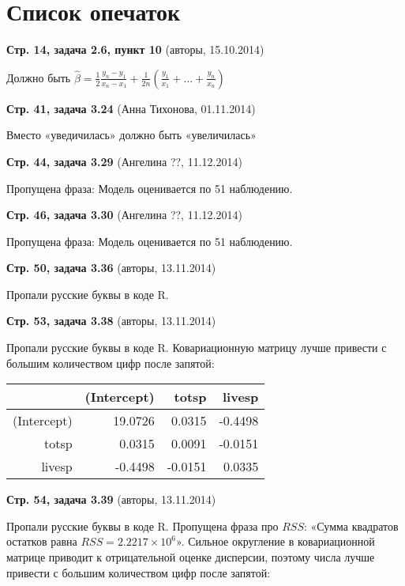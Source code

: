 \documentclass[12pt]{article} %
\newcommand{\erroronpage}[4]{\textbf{Стр. #1, #2} (#3, #4)}
\begin{document}

\section*{Список опечаток}


\erroronpage{14}{задача 2.6, пункт 10}{авторы}{15.10.2014}

Должно быть $\hat{\beta} = \frac{1}{2} \frac{y_n - y_1}{x_n - x_1} + \frac{1}{2n}  \left( \frac{y_1}{x_1} + \ldots + \frac{y_n}{x_n} \right) $

\erroronpage{41}{задача 3.24}{Анна Тихонова}{01.11.2014}

Вместо «уведичилась» должно быть «увеличилась»

\erroronpage{44}{задача 3.29}{Ангелина ??}{11.12.2014}

Пропущена фраза: Модель оценивается по 51 наблюдению.

\erroronpage{46}{задача 3.30}{Ангелина ??}{11.12.2014}

Пропущена фраза: Модель оценивается по 51 наблюдению.

\erroronpage{50}{задача 3.36}{авторы}{13.11.2014}

Пропали русские буквы в коде R.

\erroronpage{53}{задача 3.38}{авторы}{13.11.2014}

Пропали русские буквы в коде R. Ковариационную матрицу лучше привести с большим количеством цифр после запятой:

\begin{table}[ht]
\centering
\begin{tabular}{rrrr}
  \hline
 & (Intercept) & totsp & livesp \\
  \hline
(Intercept) & 19.0726 & 0.0315 & -0.4498 \\
  totsp & 0.0315 & 0.0091 & -0.0151 \\
  livesp & -0.4498 & -0.0151 & 0.0335 \\
   \hline
\end{tabular}
\end{table}


\erroronpage{54}{задача 3.39}{авторы}{13.11.2014}

Пропали русские буквы в коде R. Пропущена фраза про $RSS$:
«Сумма квадратов остатков равна $RSS=\ensuremath{2.2217\times 10^{6}}$».
Сильное округление в ковариационной матрице приводит к отрицательной оценке дисперсии, поэтому числа лучше привести с большим количеством цифр после запятой:
\end{document}
